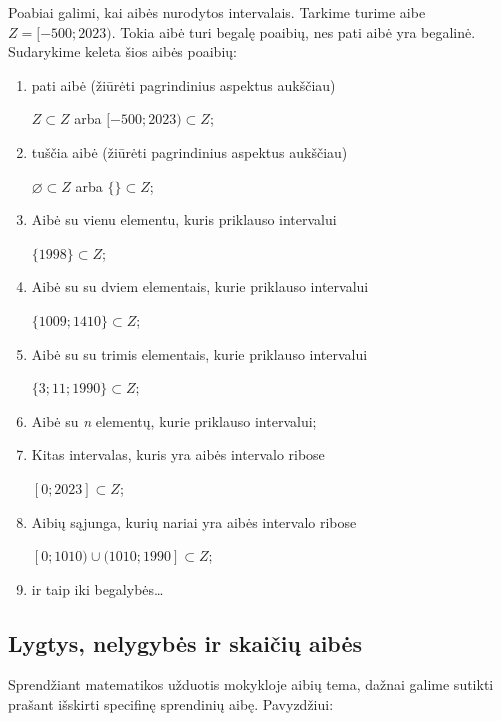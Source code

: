 \documentclass[a4paper]{article}
\begin{document}
Poabiai galimi, kai aibės nurodytos intervalais. Tarkime turime aibe $Z =
      [-500; 2023)$. Tokia aibė turi begalę poaibių, nes pati aibė yra
begalinė. Sudarykime keleta šios aibės poaibių:
\begin{enumerate}
      \item pati aibė (žiūrėti pagrindinius aspektus aukščiau)

            $Z \subset Z$ arba $[-500; 2023) \subset Z$;

      \item tuščia aibė (žiūrėti pagrindinius aspektus aukščiau)

            $ \varnothing \subset Z$ arba $\{\} \subset Z$;

      \item Aibė su vienu elementu, kuris priklauso intervalui

            $\{1998\} \subset Z$;

      \item Aibė su su dviem elementais, kurie priklauso intervalui

            $\{1009;1410\} \subset Z$;

      \item Aibė su su trimis elementais, kurie priklauso intervalui

            $\{3;11; 1990\} \subset Z$;

      \item Aibė su \textit{n} elementų, kurie priklauso intervalui;
      \item Kitas intervalas, kuris yra aibės intervalo ribose

            $[0; 2023] \subset Z$;

      \item Aibių sąjunga, kurių nariai yra aibės intervalo ribose

            $ [0; 1010) \cup (1010; 1990] \subset Z$;

      \item ir taip iki begalybės\ldots

\end{enumerate}

\subsection{Lygtys, nelygybės ir skaičių aibės}

Sprendžiant matematikos užduotis mokykloje aibių tema, dažnai galime sutikti
prašant išskirti specifinę sprendinių aibę. Pavyzdžiui:
\end{document}
